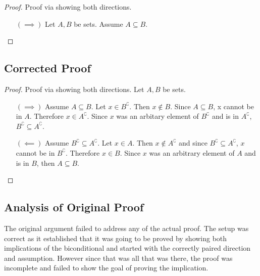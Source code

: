 \documentclass[12pt]{extarticle}
\begin{document}
\begin{proof}
	Proof via showing both directions.
	\begin{enumerate}[leftmargin=2cm]
		\item[$(\implies)$] Let $A, B$ be sets. Assume $A \subseteq B$.
	\end{enumerate}
\end{proof}

\subsection*{Corrected Proof}

\begin{proof}
	Proof via showing both directions. Let $A, B$ be sets.
	\begin{enumerate}[leftmargin=2cm]
		\item[$(\implies)$]  Assume $A \subseteq B$. Let $x \in B^\complement$. Then $x \notin B$. Since $A \subseteq B$, x cannot be in $A$. Therefore $x \in A^\complement$. Since $x$ was an arbitary element of $B^\complement$ and is in $A^\complement$, $B^\complement \subseteq A^\complement$.
		\item[$(\impliedby)$]  Assume $B^\complement \subseteq A^\complement$. Let $x \in A$. Then $x \notin A^\complement$ and since $B^\complement \subseteq A^\complement$, $x$ cannot be in $B^\complement$. Therefore $x \in B$. Since $x$ was an arbitrary element of $A$ and is in $B$, then $A \subseteq B$.
	\end{enumerate}
\end{proof}

\subsection*{Analysis of Original Proof}

The original argument failed to address any of the actual proof. The setup was correct as it established that it was going to be proved by showing both implications of the biconditional and started with the correctly paired direction and assumption. However since that was all that was there, the proof was incomplete and failed to show the goal of proving the implication.
\end{document}
